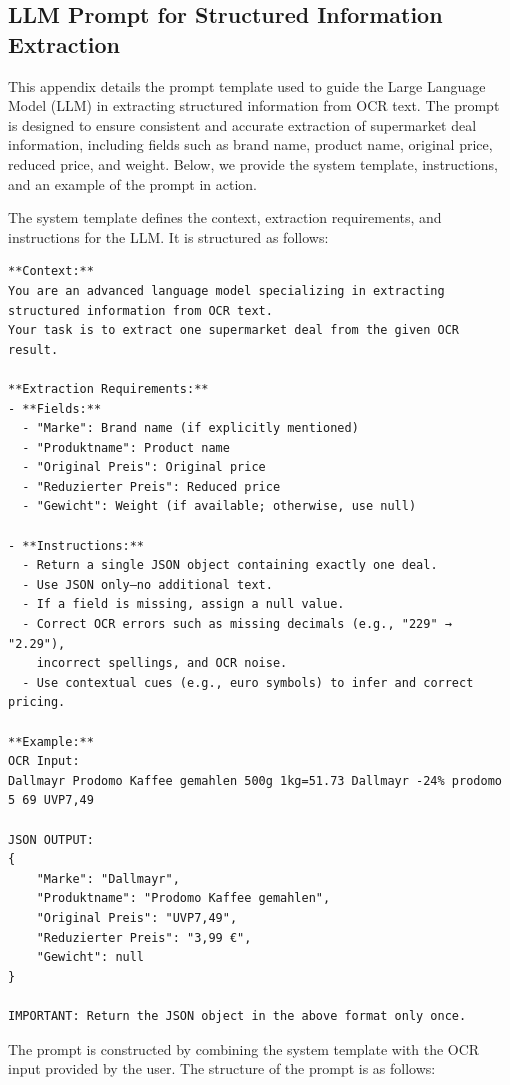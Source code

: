 \documentclass[11pt]{article}
\begin{document}
\subsection{LLM Prompt for Structured Information Extraction}
\label{app:llm_prompt}

This appendix details the prompt template used to guide the Large Language Model (LLM) in extracting structured information from OCR text. The prompt is designed to ensure consistent and accurate extraction of supermarket deal information, including fields such as brand name, product name, original price, reduced price, and weight. Below, we provide the system template, instructions, and an example of the prompt in action.

The system template defines the context, extraction requirements, and instructions for the LLM. It is structured as follows:


\begin{verbatim}
**Context:**  
You are an advanced language model specializing in extracting 
structured information from OCR text. 
Your task is to extract one supermarket deal from the given OCR result.

**Extraction Requirements:**  
- **Fields:**  
  - "Marke": Brand name (if explicitly mentioned)  
  - "Produktname": Product name  
  - "Original Preis": Original price  
  - "Reduzierter Preis": Reduced price  
  - "Gewicht": Weight (if available; otherwise, use null)

- **Instructions:**  
  - Return a single JSON object containing exactly one deal.
  - Use JSON only—no additional text.
  - If a field is missing, assign a null value.
  - Correct OCR errors such as missing decimals (e.g., "229" → "2.29"), 
    incorrect spellings, and OCR noise.
  - Use contextual cues (e.g., euro symbols) to infer and correct pricing.

**Example:**  
OCR Input:                     
Dallmayr Prodomo Kaffee gemahlen 500g 1kg=51.73 Dallmayr -24% prodomo 5 69 UVP7,49  

JSON OUTPUT:
{
    "Marke": "Dallmayr",
    "Produktname": "Prodomo Kaffee gemahlen",
    "Original Preis": "UVP7,49",
    "Reduzierter Preis": "3,99 €",
    "Gewicht": null
}

IMPORTANT: Return the JSON object in the above format only once.
\end{verbatim}

The prompt is constructed by combining the system template with the OCR input provided by the user. The structure of the prompt is as follows:
\end{document}
